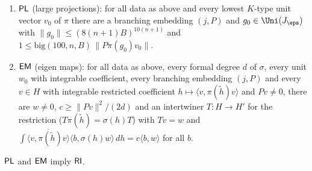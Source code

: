 \begin{definition}\label{pf:fs:branching}
\begin{enumerate}[label=(\arabic*)]
\item $\mathsf{PL}$ (large projections): for all data as above and every lowest $K$-type unit vector $v_0$ of $\pi$ there are a branching
embedding $(j,P)$ and $g_0\in\Uni(J_\eps)$ with $\|g_0\|\le(8(n+1)B)^{10(n+1)}$ and $1\le\mathrm{big}(100,n,B)\,\|P\pi(g_0)v_0\|$.
\item $\mathsf{EM}$ (eigen maps): for all data as above, every formal degree $d$ of $\sigma$, every unit $w_0$ with integrable coefficient, every
branching embedding $(j,P)$ and every $v\in H$ with integrable restricted coefficient $h\mapsto\langle v,\pi(\tilde h)v\rangle$ and $Pv\ne0$,
there are $w\ne0$, $c\ge\|Pv\|^2/(2d)$ and an intertwiner $T\colon H\to H'$ for the restriction ($T\pi(\tilde h)=\sigma(h)T$) with $Tv=w$ and
$\int\overline{\langle v,\pi(\tilde h)v\rangle}\langle b,\sigma(h)w\rangle\,dh=c\langle b,w\rangle$ for all $b$.
\end{enumerate}
\end{definition}

\begin{theorem}\label{pf:fs:realInputE}
$\mathsf{PL}$ and $\mathsf{EM}$ imply $\mathsf{RI}$.
\end{theorem}

